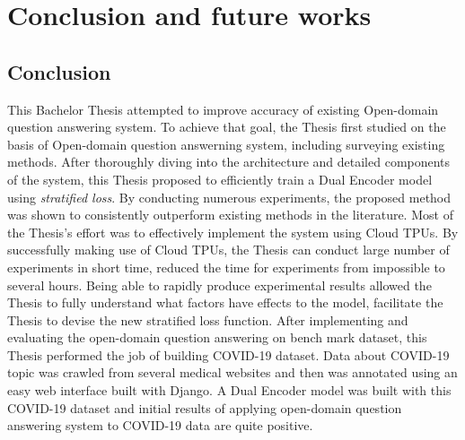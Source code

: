 \documentclass[12pt, sort&compress]{report}
\begin{document}
\chapter{Conclusion and future works}
\label{chap:06}
\section{Conclusion}
\label{sec:6.1}
This Bachelor Thesis attempted to improve accuracy of existing Open-domain question answering system. To achieve that goal, the Thesis first studied on the basis of Open-domain question answerning system, including surveying existing methods. After thoroughly diving into the architecture and detailed components of the system, this Thesis proposed to efficiently train a Dual Encoder model using \textit{stratified loss}. By conducting numerous experiments, the proposed method was shown to consistently outperform existing methods in the literature. Most of the Thesis's effort was to effectively implement the system using Cloud TPUs. By successfully making use of Cloud TPUs, the Thesis can conduct large number of experiments in short time, reduced the time for experiments from impossible to several hours. Being able to rapidly produce experimental results allowed the Thesis to fully understand what factors have effects to the model, facilitate the Thesis to devise the new stratified loss function. After implementing and evaluating the open-domain question answering on bench mark dataset, this Thesis performed the job of building COVID-19 dataset. Data about COVID-19 topic was crawled from several medical websites and then was annotated using an easy web interface built with Django. A Dual Encoder model was built with this COVID-19 dataset and initial results of applying open-domain question answering system to COVID-19 data are quite positive.
\end{document}
